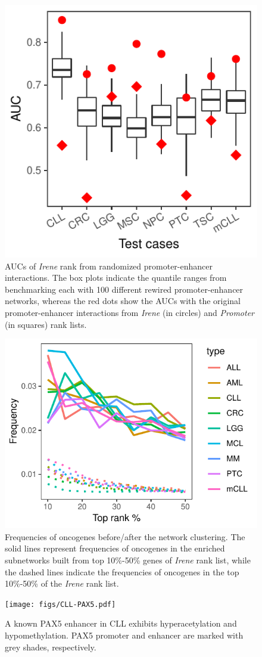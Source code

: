 \documentclass[a4paper,12pt]{article}
\begin{document}
\begin{figure}[!htb]
\centering
\includegraphics{figs/rnd.pdf}
\caption{AUCs of {\em Irene} rank from randomized promoter-enhancer interactions. The box plots indicate the quantile ranges from benchmarking each with 100 different rewired promoter-enhancer networks, whereas the red dots show the AUCs with the original promoter-enhancer interactions from {\em Irene} (in circles) and {\em Promoter} (in squares) rank lists. }
\label{fig:rnd}
\end{figure}

\begin{figure}[!htb]
\centering
\includegraphics{figs/netRank.pdf}
\caption{Frequencies of oncogenes before/after the network clustering. The solid lines represent frequencies of oncogenes in the enriched subnetworks built from top 10\%-50\% genes of {\em Irene} rank list, while the dashed lines indicate the frequencies of oncogenes in the top 10\%-50\% of the {\em Irene} rank list. }
\label{fig:netrank}
\end{figure}


\begin{figure}[!htb]
\texttt{[image: figs/CLL-PAX5.pdf]}
\caption{A known PAX5 enhancer in CLL exhibits hyperacetylation and hypomethylation. PAX5 promoter and enhancer are marked with grey shades, respectively. }
\label{fig:enhpax5}
\end{figure}
\end{document}
